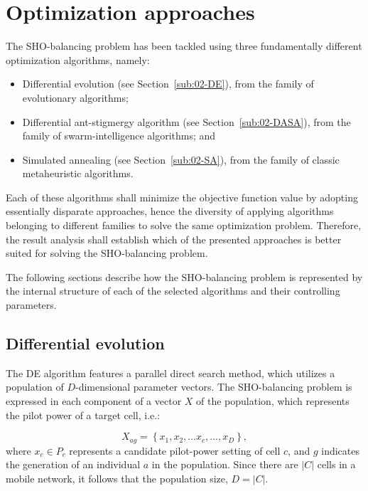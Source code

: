 \section{Optimization approaches \label{sec:07-Optimization_algorithms}}

The SHO-balancing problem has been tackled using three fundamentally
different optimization algorithms, namely:
\begin{itemize}
\item Differential evolution (see Section~\ref{sub:02-DE}), from the family
of evolutionary algorithms;
\item Differential ant-stigmergy algorithm (see Section~\ref{sub:02-DASA}),
from the family of swarm-intelligence algorithms; and
\item Simulated annealing (see Section~\ref{sub:02-SA}), from the family
of classic metaheuristic algorithms.
\end{itemize}
Each of these algorithms shall minimize the objective function value
by adopting essentially disparate approaches, hence the diversity
of applying algorithms belonging to different families to solve the
same optimization problem. Therefore, the result analysis shall establish
which of the presented approaches is better suited for solving the
SHO-balancing problem.

The following sections describe how the SHO-balancing problem is represented
by the internal structure of each of the selected algorithms and their
controlling parameters.


\subsection{Differential evolution}

The DE algorithm features a parallel direct search method, which utilizes
a population of $D$-dimensional parameter vectors. The SHO-balancing
problem is expressed in each component of a vector $X$ of the population,
which represents the pilot power of a target cell, i.e.:

\begin{equation}
X_{ag}=\left\{ x_{1},x_{2},\ldots x_{c},\ldots,x_{D}\right\} ,\label{eq:07-DE_mapping}
\end{equation}
where $x_{c}\in P_{c}$ represents a candidate pilot-power setting
of cell $c$, and $g$ indicates the generation of an individual $a$
in the population. Since there are $|C|$ cells in a mobile network,
it follows that the population size, $D=|C|$.

